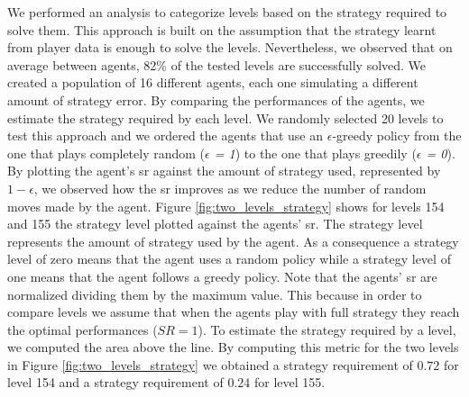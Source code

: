 We performed an analysis to categorize levels based on the strategy required to solve them. This approach is built on the assumption that the strategy learnt from player data is enough to solve the levels. Nevertheless, we observed that on average between agents, 82\% of the tested levels are successfully solved. We created a population of 16 different agents, each one simulating a different amount of strategy error. By comparing the performances of the agents, we estimate the strategy required by each level. We randomly selected 20 levels to test this approach and we ordered the agents that use an $\epsilon$-greedy policy from the one that plays completely random (\textit{$\epsilon$ = 1}) to the one that plays greedily (\textit{$\epsilon$ = 0}). By plotting the agent's \acs{sr} against the amount of strategy used, represented by \textit{$1 - \epsilon$}, we observed how the \acs{sr} improves as we reduce the number of random moves made by the agent.
Figure \ref{fig:two_levels_strategy} shows for levels 154 and 155 the strategy level plotted against the agents' \acs{sr}. The strategy level represents the amount of strategy used by the agent. As a consequence a strategy level of zero means that the agent uses a random policy while a strategy level of one means that the agent follows a greedy policy. Note that the agents' \acs{sr} are normalized dividing them by the maximum value. This because in order to compare levels we assume that when the agents play with full strategy they reach the optimal performances ($SR = 1$). To estimate the strategy required by a level, we computed the area above the line. By computing this metric for the two levels in Figure \ref{fig:two_levels_strategy} we obtained a strategy requirement of $0.72$ for level 154 and a strategy requirement of $0.24$ for level 155. 

